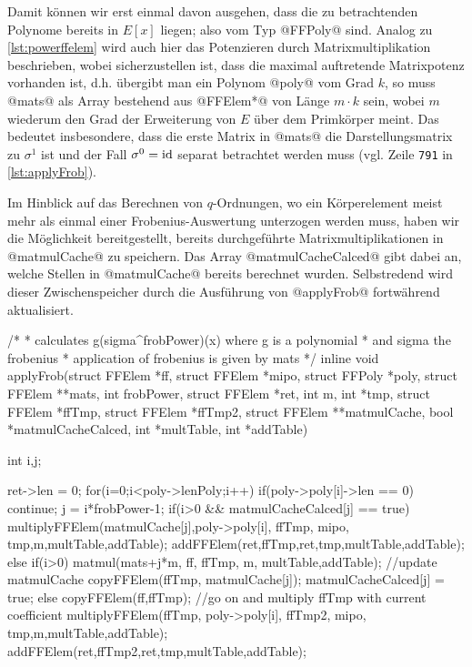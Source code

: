Damit können wir erst einmal davon ausgehen, dass die zu betrachtenden Polynome
bereits in $E[x]$ liegen; also vom Typ @FFPoly@ sind. Analog zu 
\autoref{lst:powerffelem} wird auch hier das Potenzieren durch
Matrixmultiplikation beschrieben, wobei sicherzustellen ist, dass die maximal
auftretende Matrixpotenz vorhanden ist, d.h. übergibt man ein Polynom @poly@
vom Grad $k$, so muss @mats@ als Array bestehend aus @FFElem*@ von Länge
$m\cdot k$ sein, wobei $m$ wiederum den Grad der Erweiterung von $E$ über dem
Primkörper meint. Das bedeutet insbesondere, dass die erste Matrix in @mats@
die Darstellungsmatrix zu $\sigma^1$ ist und der Fall $\sigma^0 = \operatorname{id}$ separat
betrachtet werden muss (vgl. Zeile \texttt{791} in \autoref{lst:applyFrob}).

Im Hinblick auf das Berechnen von $q$-Ordnungen, wo ein Körperelement meist
mehr als einmal einer Frobenius-Auswertung unterzogen werden muss, haben wir
die Möglichkeit bereitgestellt, bereits durchgeführte Matrixmultiplikationen in
@matmulCache@ zu speichern. Das Array @matmulCacheCalced@ gibt dabei an, welche
Stellen in @matmulCache@ bereits berechnet wurden. Selbstredend wird dieser 
Zwischenspeicher durch die Ausführung von @applyFrob@ fortwährend aktualisiert.

\begin{ccode}[caption={Aus \url{../Sage/enumeratePCNs.c}},
  firstnumber=773, label=lst:applyFrob]
/*
 * calculates g(sigma^frobPower)(x) where g is a polynomial 
 * and sigma the frobenius
 * application of frobenius is given by mats
 */
inline void applyFrob(struct FFElem *ff, struct FFElem *mipo,
        struct FFPoly *poly,
        struct FFElem **mats,
        int frobPower, struct FFElem *ret, 
        int m, int *tmp, struct FFElem *ffTmp, struct FFElem *ffTmp2,
        struct FFElem **matmulCache, bool *matmulCacheCalced,
        int *multTable, int *addTable){
    int i,j;
        
    ret->len = 0;
    for(i=0;i<poly->lenPoly;i++){
        if(poly->poly[i]->len == 0) continue;
        j = i*frobPower-1;
        if(i>0 && matmulCacheCalced[j] == true){
            multiplyFFElem(matmulCache[j],poly->poly[i],
                    ffTmp, mipo,
                    tmp,m,multTable,addTable);
            addFFElem(ret,ffTmp,ret,tmp,multTable,addTable);
        }else{
            if(i>0){
                matmul(mats+j*m, ff, ffTmp, m, multTable,addTable);
                //update matmulCache
                copyFFElem(ffTmp, matmulCache[j]);
                matmulCacheCalced[j] = true;
            }else{
                copyFFElem(ff,ffTmp);
            }
            //go on and multiply ffTmp with current coefficient
            multiplyFFElem(ffTmp, poly->poly[i],
                    ffTmp2, mipo,
                    tmp,m,multTable,addTable);
            addFFElem(ret,ffTmp2,ret,tmp,multTable,addTable);
        }
    }
}
\end{ccode}

